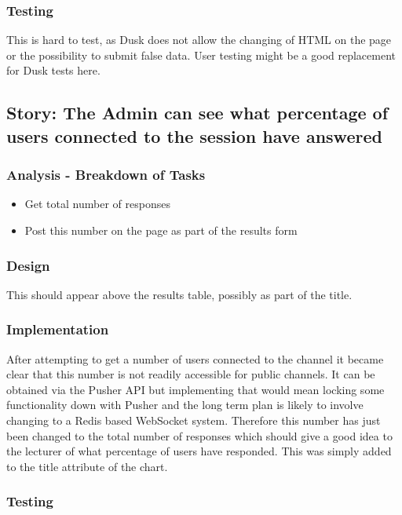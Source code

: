 \subsubsection{Testing}
This is hard to test, as Dusk does not allow the changing of HTML on the page or the possibility to submit false data. User testing might be a good replacement for Dusk tests here.
\newpage

\subsection{Story: The Admin can see what percentage of users connected to the session have answered}
\subsubsection{Analysis - Breakdown of Tasks}
\begin{itemize}
	\item Get total number of responses
	\item Post this number on the page as part of the results form
\end{itemize}
\subsubsection{Design}
This should appear above the results table, possibly as part of the title.
\subsubsection{Implementation}
After attempting to get a number of users connected to the channel it became clear that this number is not readily accessible for public channels. It can be obtained via the Pusher API but implementing that would mean locking some functionality down with Pusher and the long term plan is likely to involve changing to a Redis based WebSocket system. Therefore this number has just been changed to the total number of responses which should give a good idea to the lecturer of what percentage of users have responded. This was simply added to the title attribute of the chart.
\subsubsection{Testing}
\newpage
